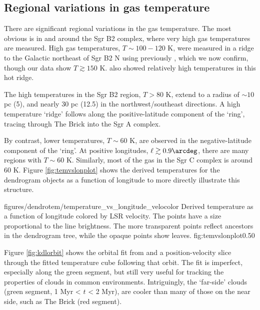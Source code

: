 \subsection{Regional variations in gas temperature}
There are significant regional variations in the gas temperature.  The most
obvious is in and around the Sgr B2 complex, where very high gas temperatures
are measured.  High gas temperatures, $T\sim100-120$ K, were measured in a ridge to the
Galactic northeast of Sgr B2 N using \methylcyanide previously \citep[][Figure
4b]{de-Vicente1997a}, which we now confirm, though our data show $T\gtrsim150$ K.
\citet{Ott2014a} also showed relatively high \ammonia temperatures in this hot
ridge.

The high temperatures in the Sgr B2 region, $T>80$ K, extend to a radius of
$\sim10$ pc (5\arcmin), and nearly 30 pc (12.5\arcmin) in the
northwest/southeast directions.  A high temperature `ridge' follows along the
positive-latitude component of the \citet{Molinari2011a} `ring', tracing
through The Brick into the Sgr A complex.

By contrast, lower temperatures, $T\sim60$ K, are observed in the
negative-latitude component of the `ring'.  At positive longitudes,
$\ell\gtrsim0.9\arcdeg$, there are many regions with $T\sim60$ K.  Similarly,
most of the gas in the Sgr C complex is around 60 K.  Figure
\ref{fig:temvslonplot} shows the derived temperatures for the dendrogram
objects as a function of longitude to more directly illustrate this structure.

\Figure
{figures/dendrotem/temperature_vs_longitude_velocolor}
{Derived temperature as a function of longitude colored by LSR velocity.
The points have a size proportional to the \threeohthree line brightness.  The
more transparent points reflect ancestors in the dendrogram tree, while the
opaque points show leaves.}
{fig:temvslonplot}{0.5}{0}

Figure \ref{fig:kdlorbit} shows the orbital fit from \citet{Kruijssen2014d} and
a position-velocity slice through the fitted temperature cube following that
orbit.  The fit is imperfect, especially along the green segment, but still very useful
for tracking the properties of clouds in common environments.  Intriguingly,
the `far-side' clouds (green segment, 1 Myr < $t$ < 2 Myr), are cooler than
many of those on the near side, such as The Brick (red segment).  


